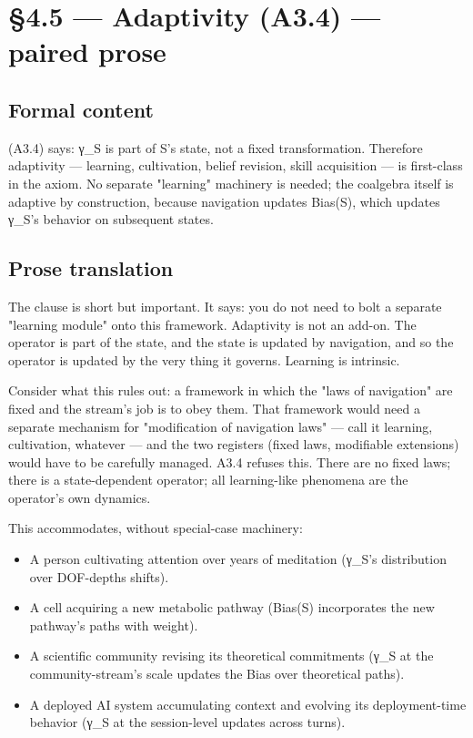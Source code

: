 \documentclass[11pt, openany]{book}
\newcommand{\sectionbreak}{\clearpage}
\begin{document}
\sectionbreak

\section{§4.5 --- Adaptivity (A3.4) --- paired prose}

\subsection{Formal content}

(A3.4) says: γ\_\allowbreak{}S is part of S's state, not a fixed transformation. Therefore adaptivity --- learning, cultivation, belief revision, skill acquisition --- is first-class in the axiom. No separate "learning" machinery is needed; the coalgebra itself is adaptive by construction, because navigation updates Bias(S), which updates γ\_\allowbreak{}S's behavior on subsequent states.

\subsection{Prose translation}

The clause is short but important. It says: you do not need to bolt a separate "learning module" onto this framework. Adaptivity is not an add-on. The operator is part of the state, and the state is updated by navigation, and so the operator is updated by the very thing it governs. Learning is intrinsic.

Consider what this rules out: a framework in which the "laws of navigation" are fixed and the stream's job is to obey them. That framework would need a separate mechanism for "modification of navigation laws" --- call it learning, cultivation, whatever --- and the two registers (fixed laws, modifiable extensions) would have to be carefully managed. A3.4 refuses this. There are no fixed laws; there is a state-dependent operator; all learning-like phenomena are the operator's own dynamics.

This accommodates, without special-case machinery:
\begin{itemize}
\item A person cultivating attention over years of meditation (γ\_\allowbreak{}S's distribution over DOF-depths shifts).
\item A cell acquiring a new metabolic pathway (Bias(S) incorporates the new pathway's paths with weight).
\item A scientific community revising its theoretical commitments (γ\_\allowbreak{}S at the community-stream's scale updates the Bias over theoretical paths).
\item A deployed AI system accumulating context and evolving its deployment-time behavior (γ\_\allowbreak{}S at the session-level updates across turns).
\end{itemize}
\end{document}
